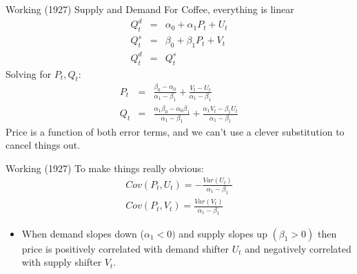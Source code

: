 \documentclass[aspectratio=169,11pt]{beamer}
\begin{document}




\begin{frame}{Working (1927)}
Supply and Demand For Coffee, everything is linear
\begin{eqnarray*}
Q_t^d &=& \alpha_0 + \alpha_1 P_t + U_t\\
Q_t^s &=& \beta_0 + \beta_1 P_t + V_t\\
Q_t^d &=& Q_t^s
\end{eqnarray*}
Solving for $P_t,Q_t$:
\begin{eqnarray*}
P_t &=& \frac{\beta_0 - \alpha_0}{\alpha_1 - \beta_1} + \frac{V_t - U_t}{\alpha_1 - \beta_1}\\
Q_t &=& \frac{\alpha_1 \beta_0 - \alpha_0 \beta_1}{\alpha_1 - \beta_1} + \frac{\alpha_1 V_t - \beta_1 U_t}{\alpha_1 - \beta_1}
\end{eqnarray*}
Price is a function of both error terms, and we can't use a clever substitution to cancel things out.
\end{frame}

\begin{frame}{Working (1927)}
To make things really obvious:
\begin{eqnarray*}
Cov(P_t,U_t) = - \frac{Var(U_t)}{\alpha_1 -\beta_1} \\
Cov(P_t,V_t) =  \frac{Var(V_t)}{\alpha_1 -\beta_1} 
\end{eqnarray*}
\begin{itemize}
\item When demand slopes down ($\alpha_1 < 0)$ and supply slopes up $(\beta_1 > 0)$ then price is positively correlated with demand shifter $U_t$ and negatively correlated with supply shifter $V_t$.
\end{itemize}
\end{frame}
\end{document}
